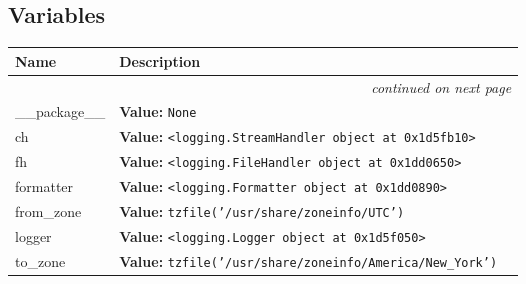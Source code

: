 
  \subsection{Variables}

    \vspace{-1cm}
\hspace{\varindent}\begin{longtable}{|p{\varnamewidth}|p{\vardescrwidth}|l}
\cline{1-2}
\cline{1-2} \centering \textbf{Name} & \centering \textbf{Description}& \\
\cline{1-2}
\endhead\cline{1-2}\multicolumn{3}{r}{\small\textit{continued on next page}}\\\endfoot\cline{1-2}
\endlastfoot\raggedright \_\-\_\-p\-a\-c\-k\-a\-g\-e\-\_\-\_\- & \raggedright \textbf{Value:} 
{\tt None}&\\
\cline{1-2}
\raggedright c\-h\- & \raggedright \textbf{Value:} 
{\tt {\textless}logging.StreamHandler object at 0x1d5fb10{\textgreater}}&\\
\cline{1-2}
\raggedright f\-h\- & \raggedright \textbf{Value:} 
{\tt {\textless}logging.FileHandler object at 0x1dd0650{\textgreater}}&\\
\cline{1-2}
\raggedright f\-o\-r\-m\-a\-t\-t\-e\-r\- & \raggedright \textbf{Value:} 
{\tt {\textless}logging.Formatter object at 0x1dd0890{\textgreater}}&\\
\cline{1-2}
\raggedright f\-r\-o\-m\-\_\-z\-o\-n\-e\- & \raggedright \textbf{Value:} 
{\tt tzfile('/usr/share/zoneinfo/UTC')}&\\
\cline{1-2}
\raggedright l\-o\-g\-g\-e\-r\- & \raggedright \textbf{Value:} 
{\tt {\textless}logging.Logger object at 0x1d5f050{\textgreater}}&\\
\cline{1-2}
\raggedright t\-o\-\_\-z\-o\-n\-e\- & \raggedright \textbf{Value:} 
{\tt tzfile('/usr/share/zoneinfo/America/New\_York')}&\\
\cline{1-2}
\end{longtable}



